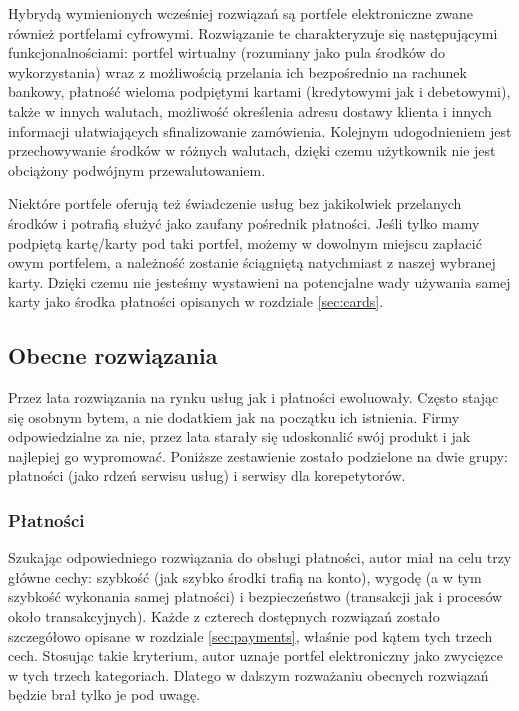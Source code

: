 \documentclass[12pt]{article}
\numberwithin{figure}{section}
\begin{document}
Hybrydą wymienionych wcześniej rozwiązań są portfele elektroniczne zwane również portfelami cyfrowymi. Rozwiązanie te charakteryzuje się następującymi funkcjonalnościami: 
portfel wirtualny (rozumiany jako pula środków do wykorzystania) wraz z możliwością przelania ich bezpośrednio na rachunek bankowy, płatność wieloma podpiętymi kartami (kredytowymi jak i debetowymi), także w innych walutach, możliwość określenia adresu dostawy klienta i innych informacji ułatwiających sfinalizowanie zamówienia. Kolejnym udogodnieniem jest przechowywanie środków w różnych walutach, dzięki czemu użytkownik nie jest obciążony podwójnym przewalutowaniem.

Niektóre portfele oferują też świadczenie usług bez jakikolwiek przelanych środków i potrafią służyć jako zaufany pośrednik płatności. Jeśli tylko mamy podpiętą kartę/karty pod taki portfel, możemy w dowolnym miejscu zapłacić owym portfelem, a należność zostanie ściągniętą natychmiast z naszej wybranej karty. Dzięki czemu nie jesteśmy wystawieni na potencjalne wady używania samej karty jako środka płatności opisanych w rozdziale \ref{sec:cards}.

\subsection{Obecne rozwiązania}
Przez lata rozwiązania na rynku usług jak i płatności ewoluowały. Często stając się osobnym bytem, a nie dodatkiem jak na początku ich istnienia. Firmy odpowiedzialne za nie, przez lata starały się udoskonalić swój produkt i jak najlepiej go wypromować. Poniższe zestawienie zostało podzielone na dwie grupy: płatności (jako rdzeń serwisu usług) i serwisy dla korepetytorów.

\subsubsection{Płatności}
Szukając odpowiedniego rozwiązania do obsługi płatności, autor miał na celu trzy główne cechy: szybkość (jak szybko środki trafią na konto), wygodę (a w tym szybkość wykonania samej płatności) i bezpieczeństwo (transakcji jak i procesów około transakcyjnych). Każde z czterech dostępnych rozwiązań zostało szczegółowo opisane w rozdziale \ref{sec:payments}, właśnie pod kątem tych trzech cech. Stosując takie kryterium, autor uznaje portfel elektroniczny jako zwycięzce w tych trzech kategoriach. Dlatego w dalszym rozważaniu obecnych rozwiązań będzie brał tylko je pod uwagę.
\end{document}
